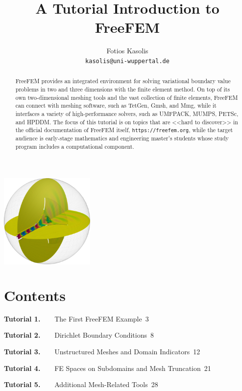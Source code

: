 \documentclass[9pt]{amsart}
\author{Fotios Kasolis\\
\MakeLowercase{\texttt{kasolis@uni-wuppertal.de}}}
\title{A Tutorial Introduction to FreeFEM}
\theoremstyle{remark}
\theoremstyle{definition}
\begin{document}
\begin{abstract}
FreeFEM provides an integrated environment for solving variational boundary value problems in two and three dimensions with the finite element method. On top of its own two-dimensional meshing tools and the vast collection of finite elements, FreeFEM can connect with meshing software, such as TetGen, Gmsh, and Mmg, while it interfaces a variety of high-performance solvers, such as UMFPACK, MUMPS, PETSc, and HPDDM. The focus of this tutorial is on topics that are <<hard to discover>> in the official documentation of FreeFEM itself, \verb!https://freefem.org!, while the target audience is early-stage mathematics and engineering master's students whose study program includes a computational component.
\end{abstract}

\maketitle
\thispagestyle{empty}

\begin{center}
\includegraphics[width=0.35\textwidth]{figs/cover}
\end{center}

\vfill

\section*{Contents}
%
%
\textbf{Tutorial 1.~~~}
The First FreeFEM Example\dotfill~3

\textbf{Tutorial 2.~~~}
Dirichlet Boundary Conditions\dotfill~8

\textbf{Tutorial 3.~~~}
Unstructured Meshes and Domain Indicators\dotfill~12

\textbf{Tutorial 4.~~~}
FE Spaces on Subdomains and Mesh Truncation\dotfill~21

\textbf{Tutorial 5.~~~}
Additional Mesh-Related Tools\dotfill~28
\end{document}
